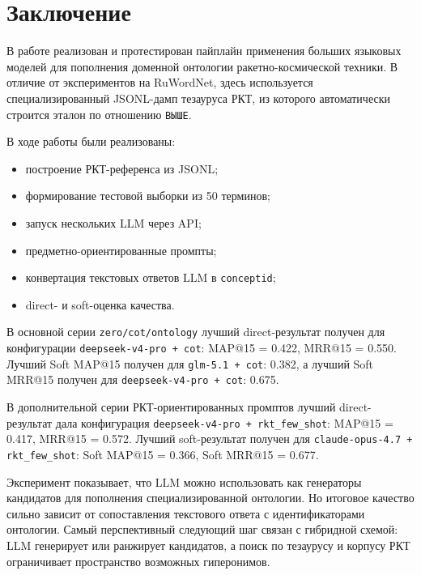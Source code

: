 \documentclass[12pt,a4paper,oneside,openany]{report}
\begin{document}
\chapter*{Заключение}

В работе реализован и протестирован пайплайн применения больших языковых моделей для пополнения доменной онтологии ракетно-космической техники. В отличие от экспериментов на RuWordNet, здесь используется специализированный JSONL-дамп тезауруса РКТ, из которого автоматически строится эталон по отношению \texttt{ВЫШЕ}.

В ходе работы были реализованы:
\begin{itemize}
  \item построение РКТ-референса из JSONL;
  \item формирование тестовой выборки из 50 терминов;
  \item запуск нескольких LLM через API;
  \item предметно-ориентированные промпты;
  \item конвертация текстовых ответов LLM в \texttt{conceptid};
  \item direct- и soft-оценка качества.
\end{itemize}

В основной серии \texttt{zero/cot/ontology} лучший direct-результат получен для конфигурации \texttt{deepseek-v4-pro + cot}: MAP@15 = 0.422, MRR@15 = 0.550. Лучший Soft MAP@15 получен для \texttt{glm-5.1 + cot}: 0.382, а лучший Soft MRR@15 получен для \texttt{deepseek-v4-pro + cot}: 0.675.

В дополнительной серии РКТ-ориентированных промптов лучший direct-результат дала конфигурация \texttt{deepseek-v4-pro + rkt\_few\_shot}: MAP@15 = 0.417, MRR@15 = 0.572. Лучший soft-результат получен для \texttt{claude-opus-4.7 + rkt\_few\_shot}: Soft MAP@15 = 0.366, Soft MRR@15 = 0.677.

Эксперимент показывает, что LLM можно использовать как генераторы кандидатов для пополнения специализированной онтологии. Но итоговое качество сильно зависит от сопоставления текстового ответа с идентификаторами онтологии. Самый перспективный следующий шаг связан с гибридной схемой: LLM генерирует или ранжирует кандидатов, а поиск по тезаурусу и корпусу РКТ ограничивает пространство возможных гиперонимов.
\end{document}
